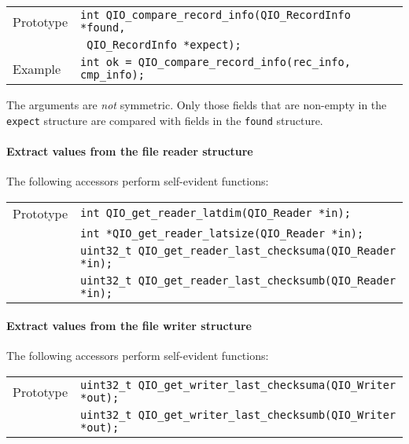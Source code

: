 \documentclass{article}
\begin{document}
%
\begin{flushleft}
  \begin{tabular}{|l|l|}
  \hline
  Prototype      & \verb|int QIO_compare_record_info(QIO_RecordInfo *found,|\\
                 & \verb| QIO_RecordInfo *expect);| \\
\hline
  Example  & \verb|int ok = QIO_compare_record_info(rec_info, cmp_info);|\\
   \hline
 \end{tabular}
\end{flushleft}
%
The arguments are {\it not} symmetric.  Only those fields that are
non-empty in the \verb|expect| structure are compared with fields in
the \verb|found| structure.

\paragraph{Extract values from the file reader structure}
The following accessors perform self-evident functions:
%
%
\begin{flushleft}
  \begin{tabular}{|l|l|}
  \hline
  Prototype      & \verb|int QIO_get_reader_latdim(QIO_Reader *in);| \\
                 & \verb|int *QIO_get_reader_latsize(QIO_Reader *in);| \\
                 & \verb|uint32_t QIO_get_reader_last_checksuma(QIO_Reader *in);| \\
                 & \verb|uint32_t QIO_get_reader_last_checksumb(QIO_Reader *in);| \\
\hline
 \end{tabular}
\end{flushleft}

\paragraph{Extract values from the file writer structure}
The following accessors perform self-evident functions:
%
%
\begin{flushleft}
  \begin{tabular}{|l|l|}
  \hline
  Prototype      & \verb|uint32_t QIO_get_writer_last_checksuma(QIO_Writer *out);| \\
                 & \verb|uint32_t QIO_get_writer_last_checksumb(QIO_Writer *out);| \\
\hline
 \end{tabular}
\end{flushleft}
\end{document}
